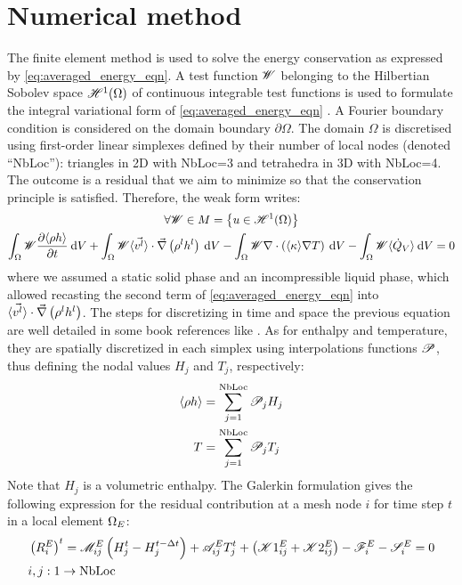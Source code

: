 \section{Numerical method}
%
The finite element method is used to solve the energy conservation as expressed by \cref{eq:averaged_energy_eqn}. 
A test function $\mathscr{W}$ belonging to the Hilbertian Sobolev space $\mathscr{H}^1(\Omega)$ of continuous integrable test functions 
is used to formulate the integral variational form of \cref{eq:averaged_energy_eqn} \citep{suli_lecture_2000}. 
A Fourier boundary condition is considered on the domain boundary $\partial \Omega$. The domain $\Omega$
is discretised using first-order linear simplexes defined by their number of local nodes (denoted “NbLoc”): triangles 
in 2D with NbLoc=3 and tetrahedra in 3D with  NbLoc=4. The outcome is a residual that we aim to minimize so that the 
conservation principle is satisfied. Therefore, the weak form writes:
\begin{multline}
\label{eq:weak_energy}
\forall \mathscr{W} \in M=\left\{ u \in \mathscr{H}^1(\Omega) \right\} \\
\int_{\Omega} \mathscr{W} \frac{\partial \langle  \rho h  \rangle}{\partial t} \: \mathrm{d}V 
 + \int_{\Omega} \mathscr{W} \langle \vec{v^l} \rangle \cdot \vec{\nabla} \left( \rho^l h^l \right)\: \mathrm{d}V
 - \int_{\Omega} \mathscr{W} \nabla \cdot\left( \langle \kappa \rangle \nabla T \right)  \: \mathrm{d}V
 - \int_{\Omega} \mathscr{W} \langle \dot{Q}_{{V}} \rangle \: \mathrm{d}V
 = 0
\end{multline}
where we assumed a static solid phase and an incompressible liquid phase, which allowed recasting the second term of 
\cref{eq:averaged_energy_eqn} into $\langle \vec{v^l} \rangle \cdot \vec{\nabla} \left( \rho^l h^l \right)$. 
The steps for discretizing in time and space the previous equation are well detailed in  some book references like \citet{rappaz_numerical_2003,dantzig_solidification_2009}. As for enthalpy and temperature, they are spatially discretized in each simplex 
using interpolations functions $\mathscr{P}$, thus defining the nodal values $H_j$ and $T_j$, respectively: 
\begin{align}
\label{eq:discretise_H}
\langle  \rho h  \rangle 	&= \sum_{j=1}^{\text{NbLoc}}  \mathscr{P}_j   H_j \\ 
\label{eq:discretise_T}
T		&= \sum_{j=1}^{\text{NbLoc}}  \mathscr{P}_j   T_j
\end{align}
Note that $H_j$ is a volumetric enthalpy. The Galerkin formulation gives the following expression for the residual contribution at a mesh node $i$ for time step $t$ in a local element $\Omega_E$:
\begin{align}
\begin{split}
\label{eq:discretise_residual_local}
& \left( R_i^E \right)^t = \mathscr{M}_{ij}^E \left( H_j^t - H_j^{t-\Delta t} \right) + \mathscr{A}_{ij}^E T_j^t + \left( \mathscr{K}1_{ij}^E + \mathscr{K}2_{ij}^E \right)-\mathscr{F}_{i}^E - \mathscr{S}_{i}^E=0 \\
& i,j:1 \rightarrow \text{NbLoc}
\end{split}
\end{align}
